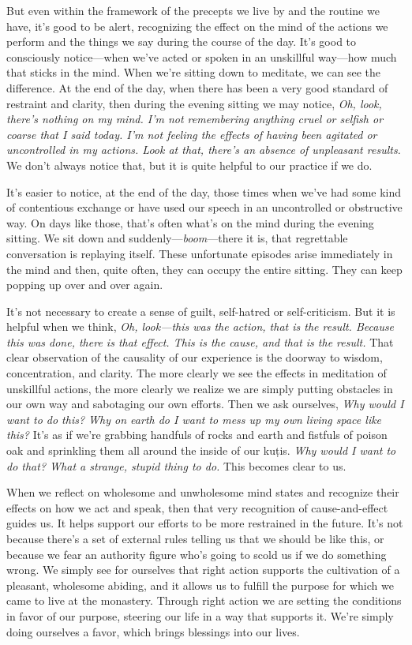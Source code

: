 But even within the framework of the precepts we live by and the 
routine we have, it's good to be alert, recognizing the effect on the 
mind of the actions we perform and the things we say during the course 
of the day. It's good to consciously notice---when we've acted or 
spoken in an unskillful way---how much that sticks in the mind. When 
we're sitting down to meditate, we can see the difference. At the end 
of the day, when there has been a very good standard of restraint and 
clarity, then during the evening sitting we may notice, \emph{Oh, look, 
there's nothing on my mind. I'm not remembering anything cruel or 
selfish or coarse that I said today. I'm not feeling the effects of 
having been agitated or uncontrolled in my actions. Look at that, 
there's an absence of unpleasant results.} We don't always notice that, 
but it is quite helpful to our practice if we do.

It's easier to notice, at the end of the day, those times when we've 
had some kind of contentious exchange or have used our speech in an 
uncontrolled or obstructive way. On days like those, that's often 
what's on the mind during the evening sitting. We sit down and 
suddenly---\emph{boom}---there it is, that regrettable conversation is 
replaying itself. These unfortunate episodes arise immediately in the 
mind and then, quite often, they can occupy the entire sitting. They 
can keep popping up over and over again.

It's not necessary to create a sense of guilt, self-hatred or 
self-criticism. But it is helpful when we think, \emph{Oh, look---this 
was the action, that is the result. Because this was done, there is 
that effect. This is the cause, and that is the result.} That clear 
observation of the causality of our experience is the doorway to 
wisdom, concentration, and clarity. The more clearly we see the effects 
in meditation of unskillful actions, the more clearly we realize we are 
simply putting obstacles in our own way and sabotaging our own efforts. 
Then we ask ourselves, \emph{Why would I want to do this? Why on earth 
do I want to mess up my own living space like this?} It's as if we're 
grabbing handfuls of rocks and earth and fistfuls of poison oak and 
sprinkling them all around the inside of our kuṭis. \emph{Why would I 
want to do that? What a strange, stupid thing to do.} This becomes 
clear to us.

When we reflect on wholesome and unwholesome mind states and recognize 
their effects on how we act and speak, then that very recognition of 
cause-and-effect guides us. It helps support our efforts to be more 
restrained in the future. It's not because there's a set of external 
rules telling us that we should be like this, or because we fear an 
authority figure who's going to scold us if we do something wrong. We 
simply see for ourselves that right action supports the cultivation of 
a pleasant, wholesome abiding, and it allows us to fulfill the purpose 
for which we came to live at the monastery. Through right action we are 
setting the conditions in favor of our purpose, steering our life in a 
way that supports it. We're simply doing ourselves a favor, which 
brings blessings into our lives.

